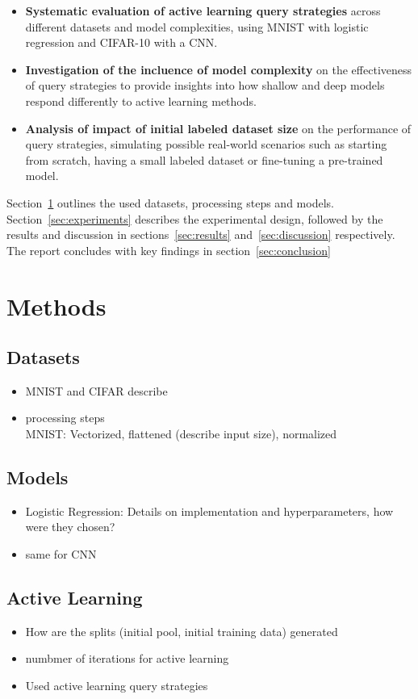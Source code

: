 \documentclass{article}
\theoremstyle{plain}
\theoremstyle{definition}
\theoremstyle{remark}
\begin{document}
\begin{itemize}
	\item \textbf{Systematic evaluation of active learning query strategies} across different datasets and model complexities, using MNIST with logistic regression and CIFAR-10 with a CNN.
	\item \textbf{Investigation of the incluence of model complexity} on the effectiveness of query strategies to provide insights into how shallow and deep models respond differently to active learning methods.
	\item \textbf{Analysis of impact of initial labeled dataset size} on the performance of query strategies, simulating possible real-world scenarios such as starting from scratch, having a small labeled dataset or fine-tuning a pre-trained model.
\end{itemize}
Section~\ref{sec:methods} outlines the used datasets, processing steps and models. Section~\ref{sec:experiments} describes the experimental design, followed by the results and discussion in sections~\ref{sec:results} and~\ref{sec:discussion} respectively. The report concludes with key findings in section~\ref{sec:conclusion}

\section{Methods}\label{sec:methods}
\label{data_and_methods}
\subsection{Datasets}
\begin{itemize}
	\item MNIST and CIFAR describe
	\item processing steps \\
	MNIST: Vectorized, flattened (describe input size), normalized
\end{itemize}

\subsection{Models}
\begin{itemize}
	\item Logistic Regression: Details on implementation and hyperparameters, how were they chosen?
	\item same for CNN
\end{itemize}

\subsection{Active Learning}
\begin{itemize}
	\item How are the splits (initial pool, initial training data) generated
	\item numbmer of iterations for active learning
	\item Used active learning query strategies
\end{itemize}
\end{document}
